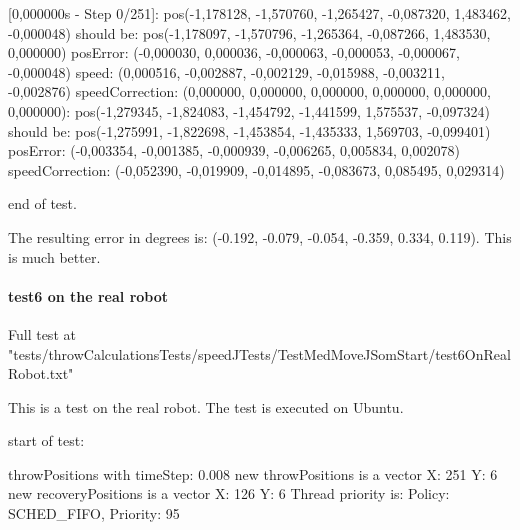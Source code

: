 [0,000000s - Step 0/251]:\newline 
\hspace{1cm}	pos(-1,178128, -1,570760, -1,265427, -0,087320, 1,483462, -0,000048) should be: \newline 
\hspace{1cm}	pos(-1,178097, -1,570796, -1,265364, -0,087266, 1,483530, 0,000000)\newline 
\hspace{1cm}	posError: (-0,000030, 0,000036, -0,000063, -0,000053, -0,000067, -0,000048)\newline 
\hspace{1cm}	speed: (0,000516, -0,002887, -0,002129, -0,015988, -0,003211, -0,002876)\newline 
\hspace{1cm}	speedCorrection: (0,000000, 0,000000, 0,000000, 0,000000, 0,000000, 0,000000)\newline 
[2,000000s - Step 250/251]:\newline 
\hspace{1cm}	pos(-1,279345, -1,824083, -1,454792, -1,441599, 1,575537, -0,097324) should be: \newline 
\hspace{1cm}	pos(-1,275991, -1,822698, -1,453854, -1,435333, 1,569703, -0,099401)\newline 
\hspace{1cm}	posError: (-0,003354, -0,001385, -0,000939, -0,006265, 0,005834, 0,002078)\newline 
\hspace{1cm}	speedCorrection: (-0,052390, -0,019909, -0,014895, -0,083673, 0,085495, 0,029314)\newline 

end of test.\newline 

The resulting error in degrees is: (-0.192, -0.079, -0.054, -0.359, 0.334, 0.119). This is much better.

\paragraph{test6 on the real robot}
Full test at "tests/throwCalculationsTests/speedJTests/TestMedMoveJSomStart/test6OnRealRobot.txt"

This is a test on the real robot. The test is executed on Ubuntu.

start of test: \newline 

throwPositions with timeStep:  0.008\newline 
new throwPositions is a vector X: 251 Y:  6\newline 
new recoveryPositions is a vector X: 126 Y:  6\newline 
Thread priority is: \newline 
Policy: SCHED\_FIFO, Priority: 95\newline 

